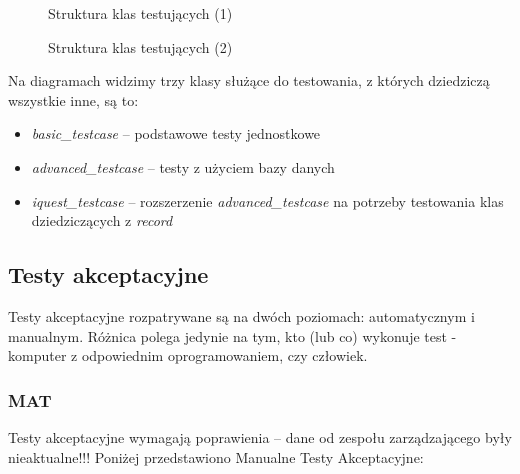 \newpage
\begin{figure}[H]
\begin{center}
 
\end{center}
\caption{Struktura klas testujących (1)}
\label{fig:tests1}
\end{figure}
\newpage
\begin{figure}[H]
\begin{center}
 
\end{center}
\caption{Struktura klas testujących (2)}
\label{fig:tests2}
\end{figure}
\newpage

Na diagramach widzimy trzy klasy służące do testowania, z których dziedziczą wszystkie inne, są to:
\begin{itemize}
\item \emph{basic\_testcase} -- podstawowe testy jednostkowe
\item \emph{advanced\_testcase} -- testy z użyciem bazy danych
\item \emph{iquest\_testcase} -- rozszerzenie \emph{advanced\_testcase} na potrzeby testowania klas dziedziczących z \emph{record}
\end{itemize}

\subsection{Testy akceptacyjne}
\label{Chapter713}

Testy akceptacyjne rozpatrywane są na dwóch poziomach: automatycznym i manualnym. Różnica polega jedynie na tym, kto (lub co) wykonuje test - komputer z odpowiednim oprogramowaniem, czy człowiek.

\subsubsection{MAT}
\label{Chapter7131}
{\color{red}Testy akceptacyjne wymagają poprawienia -- dane od zespołu zarządzającego były nieaktualne!!!}
Poniżej przedstawiono Manualne Testy Akceptacyjne:

\matpres
{}
\matsteps
{}
\matremark{}


